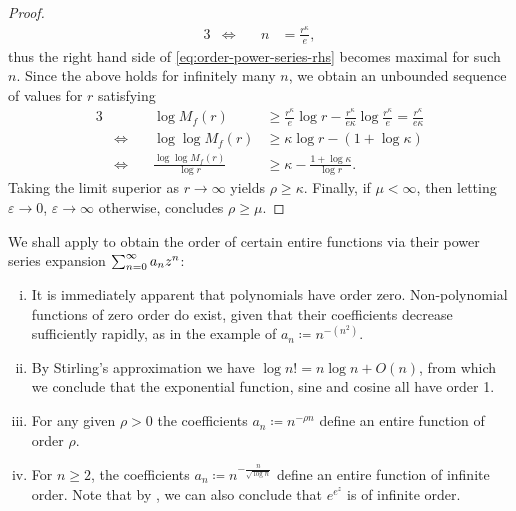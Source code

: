 \begin{proof}
\begin{alignat*}{3}
        &\Leftrightarrow \quad & n      &= \frac{r^\kappa}{e},
    \end{alignat*}
    thus the right hand side of \eqref{eq:order-power-series-rhs} becomes maximal for such $n$. Since the above holds for infinitely many $n$, we obtain an unbounded sequence of values for $r$ satisfying
    \begin{alignat*}{3}
        &                 \quad & \log M_f(r) &\geq \frac{r^\kappa}{e} \log r - \frac{r^\kappa}{e \kappa} \log \frac{r^\kappa}{e} = \frac{r^\kappa}{e \kappa} \\
        & \Leftrightarrow \quad & \log \log M_f(r) &\geq \kappa \log r - (1 + \log \kappa) \\
        & \Leftrightarrow \quad & \frac{\log \log M_f(r)}{\log r} &\geq \kappa - \frac{1 + \log \kappa}{\log r}.
    \end{alignat*}
    Taking the limit superior as $r \to \infty$ yields $\rho \geq \kappa$. Finally, if $\mu < \infty$, then letting $\varepsilon \to 0$, $\varepsilon \to \infty$ otherwise, concludes $\rho \geq \mu$.

\end{proof}

\begin{example} \label{exm:examples-orders}
    We shall apply  to obtain the order of certain entire functions via their power series expansion $ \sum_{n=0}^\infty {a_n}z^{n} $:

    \begin{enumerate}[i.]
        \item It is immediately apparent that polynomials have order zero. Non-polynomial functions of zero order do exist, given that their coefficients decrease sufficiently rapidly, as in the example of $a_n \coloneqq n^{-(n^2)} $.
        \item By Stirling's approximation we have $ \log n! = n \log n + O(n) $, from which we conclude that the exponential function, sine and cosine all have order 1.
        \item For any given $\rho > 0$ the coefficients $ a_n \coloneqq n^{- \rho n} $ define an entire function of order $\rho$.
        \item For $n \geq 2$, the coefficients $ a_n \coloneqq n^{- \frac{n}{\sqrt{\log n}}} $ define an entire function of infinite order. Note that by , we can also conclude that $e^{e^z}$ is of infinite order.
    \end{enumerate}
\end{example}



